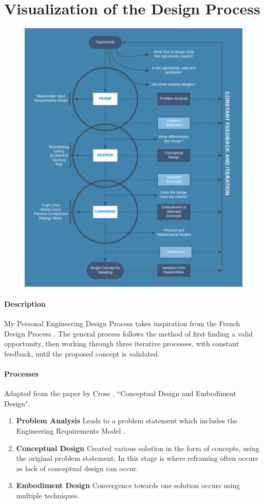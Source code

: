 \documentclass[paper=a4, fontsize=11pt]{article} %
\begin{document}
\section{Visualization of the Design Process}
    \begin{figure}[H]
        \centering
        \includegraphics[scale=0.95]{flowchart.png}
    \end{figure}
    \paragraph{Description}
    My Personal Engineering Design Process takes inspiration from the French Design Process \cite{french}. The general process follows the method of first finding a valid opportunity, then working through three iterative processes, with constant feedback, until the proposed concept is validated.
    
    \paragraph{Processes}
    Adapted from the paper by Cross \cite{cross}, ``Conceptual Design and Embodiment Design".
        \begin{enumerate}
            \item \textbf{Problem Analysis}
             Leads to a problem statement which includes the Engineering Requirements Model \cite{erm}.
            \item \textbf{Conceptual Design}
             Created various solution in the form of concepts, using the original problem statement. In this stage is where reframing often occurs as lack of conceptual design can occur.
            \item \textbf{Embodiment Design}
             Convergence towards one solution occurs using multiple techniques.
        \end{enumerate}
\end{document}
